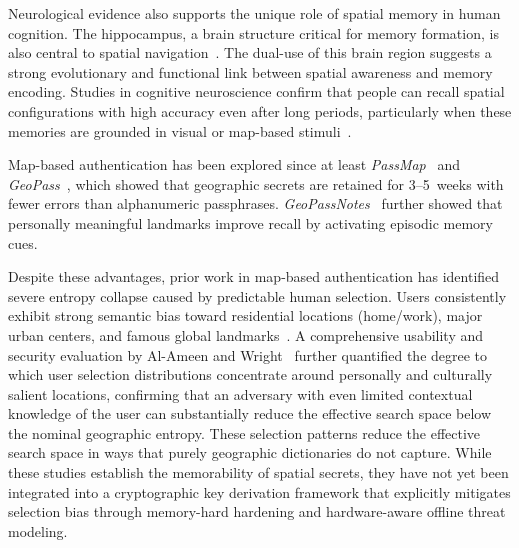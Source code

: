 \documentclass[journal,article,submit,pdftex,moreauthors]{Definitions/mdpi}
\newcommand{\add}[1]{#1}
\newcommand{\remove}[1]{}
\newcommand{\add}[1]{\added{#1}}
\newcommand{\remove}[1]{\deleted{#1}}
\begin{document}
Neurological evidence also supports the unique role of spatial memory in human cognition. The hippocampus, a brain structure critical for memory formation, is also central to spatial navigation~\cite{McNaughton1991}. The dual-use of this brain region suggests a strong evolutionary and functional link between spatial awareness and memory encoding. Studies in cognitive neuroscience confirm that people can recall spatial configurations with high accuracy even after long periods, particularly when these memories are grounded in visual or map-based stimuli~\cite{Konkle2010, Lukavsky2017}.

\remove{More recently, spatial interfaces have been proposed in password systems and digital authentication~\cite{Bauer1993}. Although graphical passwords do not directly translate to geographic locations, their effectiveness demonstrates that spatially anchored memory cues are more durable than abstract password recall. In usability studies, users retained spatially-based authentication secrets for longer durations and with fewer errors compared to textual passphrases~\cite{Garden2002}.}

\remove{These findings suggest that spatial memory may provide a superior foundation for cryptographic key storage and retrieval mechanisms. Unlike traditional brainwallets that rely on memorized strings, a system that anchors a seed derivation process to a spatial coordinate or map location would naturally exploit this cognitive strength. Such systems could offer both better security and usability, reducing the cognitive load while maintaining high entropy—especially when combined with computational functions that bind access to the correct location and effort.}

\add{Map-based authentication has been explored since at least \textit{PassMap}~\cite{Sun2012} and \textit{GeoPass}~\cite{Thorpe2013}, which showed that geographic secrets are retained for 3--5~weeks with fewer errors than alphanumeric passphrases. \textit{GeoPassNotes}~\cite{MacRae2016} further showed that personally meaningful landmarks improve recall by activating episodic memory cues.}

\add{Despite these advantages, prior work in map-based authentication has identified severe entropy collapse caused by predictable human selection. Users consistently exhibit strong semantic bias toward residential locations (home/work), major urban centers, and famous global landmarks~\cite{Sun2012, Thorpe2013, AlAmeen2014}. A comprehensive usability and security evaluation by Al-Ameen and Wright~\cite{AlAmeen2014} further quantified the degree to which user selection distributions concentrate around personally and culturally salient locations, confirming that an adversary with even limited contextual knowledge of the user can substantially reduce the effective search space below the nominal geographic entropy. These selection patterns reduce the effective search space in ways that purely geographic dictionaries do not capture. While these studies establish the memorability of spatial secrets, they have not yet been integrated into a cryptographic key derivation framework that explicitly mitigates selection bias through memory-hard hardening and hardware-aware offline threat modeling.}
\end{document}
